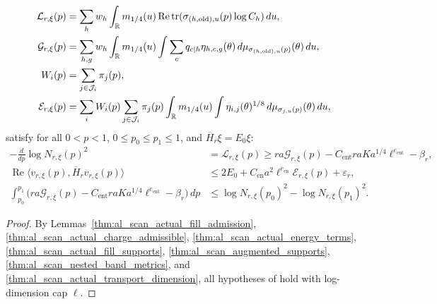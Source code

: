 \begin{lemma}
\begin{align}
        \mathcal L_{r,\xi}(p)
               & =\sum_h w_h\int_{\mathbb R}m_{1/4}(u)
        \operatorname{Re}\operatorname{tr}
        (\sigma_{(h,\mathrm{old}),u}(p)\log C_h)\,du, \notag        \\
        \mathcal G_{r,\xi}(p)
               & =\sum_{h,g}w_h\int_{\mathbb R}m_{1/4}(u)
        \int\sum_c q_{c\mid h}\eta_{h,c,g}(\theta)
        \,d\mu_{\sigma_{(h,\mathrm{old}),u}(p)}(\theta)\,du, \notag \\
        W_i(p) & =\sum_{j\in\mathcal J_i}\pi_j(p), \notag           \\
        \mathcal E_{r,\xi}(p)
               & =\sum_i W_i(p)\sum_{j\in\mathcal J_i}\pi_j(p)
        \int_{\mathbb R}m_{1/4}(u)
        \int\eta_{i,j}(\theta)^{1/8}
        \,d\mu_{\sigma_{j,u}(p)}(\theta)\,du,
        \label{eq:al_scan_transport_functionals}
    \end{align}
    satisfy for all $0<p<1$, $0\le p_0\le p_1\le1$, and
    $\overline H_r\xi=E_0\xi$:
    \begin{align}
        -\frac{d}{dp}\log N_{r,\xi}(p)^2
         & =\mathcal L_{r,\xi}(p)
        \ge ra\mathcal G_{r,\xi}(p)
        -C_{\mathrm{ent}}raK a^{1/4}\ell^{e_{\mathrm{ent}}}-\beta_r,
        \label{eq:al_scan_transport_diff_bound}              \\
        \operatorname{Re}\langle v_{r,\xi}(p),\overline H_r v_{r,\xi}(p)\rangle
         & \le 2E_0+C_{\mathrm{en}}a^2\ell^{e_{\mathrm{en}}}
        \mathcal E_{r,\xi}(p)+\varepsilon_r,
        \label{eq:al_scan_transport_energy_bound}            \\
        \int_{p_0}^{p_1}\bigl(ra\mathcal G_{r,\xi}(p)
        -C_{\mathrm{ent}}raK a^{1/4}\ell^{e_{\mathrm{ent}}}-\beta_r\bigr)\,dp
         & \le\log N_{r,\xi}(p_0)^2-\log N_{r,\xi}(p_1)^2.
        \label{eq:al_scan_transport_int_bound}
    \end{align}
\end{lemma}
\begin{proof}\leanok
    By Lemmas~\ref{thm:al_scan_actual_fill_admission},
    \ref{thm:al_scan_actual_charge_admissible},
    \ref{thm:al_scan_actual_energy_terms},
    \ref{thm:al_scan_actual_fill_supports},
    \ref{thm:al_scan_augmented_supports},
    \ref{thm:al_scan_nested_band_metrics}, and
    \ref{thm:al_scan_actual_transport_dimension}, all hypotheses of
    \cite[Proposition~7.4]{OpenAI2026AreaLaw} hold with log-dimension cap
    $\ell$.
\end{proof}

